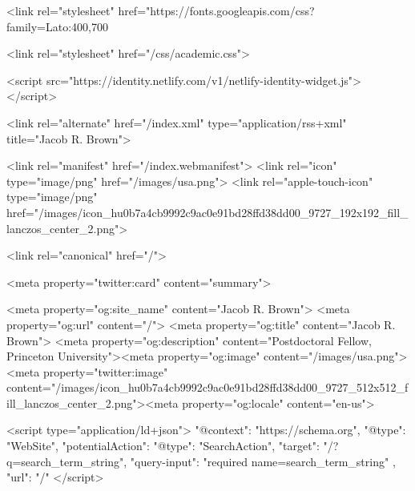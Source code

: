   <link rel="stylesheet" href="https://fonts.googleapis.com/css?family=Lato:400,700%






  <link rel="stylesheet" href="/css/academic.css">











  <script src="https://identity.netlify.com/v1/netlify-identity-widget.js"></script>



  <link rel="alternate" href="/index.xml" type="application/rss+xml" title="Jacob R. Brown">


  <link rel="manifest" href="/index.webmanifest">
  <link rel="icon" type="image/png" href="/images/usa.png">
  <link rel="apple-touch-icon" type="image/png" href="/images/icon_hu0b7a4cb9992c9ac0e91bd28ffd38dd00_9727_192x192_fill_lanczos_center_2.png">

  <link rel="canonical" href="/">












  <meta property="twitter:card" content="summary">

  <meta property="og:site_name" content="Jacob R. Brown">
  <meta property="og:url" content="/">
  <meta property="og:title" content="Jacob R. Brown">
  <meta property="og:description" content="Postdoctoral Fellow, Princeton University"><meta property="og:image" content="/images/usa.png">
  <meta property="twitter:image" content="/images/icon_hu0b7a4cb9992c9ac0e91bd28ffd38dd00_9727_512x512_fill_lanczos_center_2.png"><meta property="og:locale" content="en-us">






<script type="application/ld+json">
{
  "@context": "https://schema.org",
  "@type": "WebSite",
  "potentialAction": {
    "@type": "SearchAction",
    "target": "/?q={search_term_string}",
    "query-input": "required name=search_term_string"
  },
  "url": "/"
}
</script>














